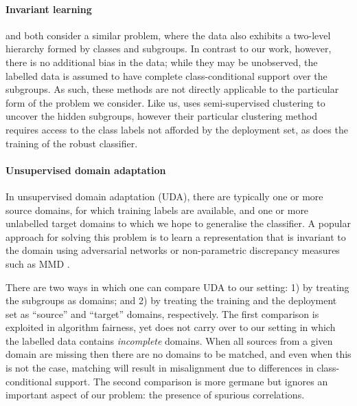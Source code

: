 \paragraph{Invariant learning}
\citet{SohDunAngGuetal20} and \citet{creager2021environment} both consider a similar problem, where
the data also exhibits a two-level hierarchy formed by classes and subgroups.
%
In contrast to our work, however, there is no additional bias in the data; while they may be
unobserved, the labelled data is assumed to have complete class-conditional support over the
subgroups.
%
As such, these methods are not directly applicable to the particular form of the problem we
consider.
%
Like us, \citet{SohDunAngGuetal20} uses semi-supervised clustering to uncover the hidden subgroups,
however their particular clustering method requires access to the class labels not afforded by the
deployment set, as does the training of the robust classifier.

\paragraph{Unsupervised domain adaptation}
In unsupervised domain adaptation (UDA), there are typically one or more source domains, for which
training labels are available, and one or more unlabelled target domains to which we hope to
generalise the classifier.
%
A popular approach for solving this problem is to learn a representation that is invariant to the
domain using adversarial networks \citep{ganin2016domain} or non-parametric discrepancy measures
such as MMD \citep{gretton2012kernel}.
%

There are two ways in which one can compare UDA to our setting: 1) by treating the subgroups as
domains; and 2) by treating the training and the deployment set as ``source'' and ``target''
domains, respectively.
%
The first comparison is exploited in algorithm fairness, yet does not carry over to our setting in
which the labelled data contains \emph{incomplete} domains. 
%
When all sources from a given domain are missing then there are no domains to be matched, and even
when this is not the case, matching will result in misalignment due to differences in
class-conditional support.
%
The second comparison is more germane but ignores an important aspect of our problem: the presence
of spurious correlations.
%

